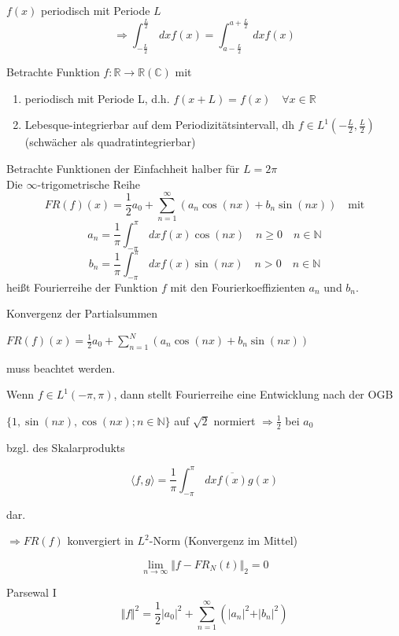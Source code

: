 \documentclass{physikprotokoll}
\begin{document}
	\begin{Bem}
		$f(x)$ periodisch mit Periode $L$
		$$\Rightarrow \int_{-\frac{L}{2}}^{\frac{L}{2}} \,dx f(x) = \int_{a-\frac{L}{2}}^{a+\frac{L}{2}} \,dx f(x)$$
	\end{Bem}

	Betrachte Funktion $f: \mathbb{R}\rightarrow\mathbb{R}(\mathbb{C})$ mit
	\begin{enumerate}[label=(\roman*)]
		\item periodisch mit Periode L, d.h. $f(x+L) = f(x) \quad \forall x \in \mathbb{R}$
		\item Lebesque-integrierbar auf dem Periodizitätsintervall, dh $f \in L^1(-\frac{L}{2},\frac{L}{2})$ (schwächer als quadratintegrierbar)
	\end{enumerate}

	Betrachte Funktionen der Einfachheit halber für $L=2\pi$\\
	Die $\infty$-trigometrische Reihe
	$$FR(f)(x)= \frac{1}{2} a_0 + \sum_{n=1}^\infty (a_n \cos(n x) + b_n \sin(n x)) \quad \textrm{mit}$$
	$$a_n = \frac{1}{\pi} \int_{-\pi}^{\pi} \,dx f(x)\cos(nx) \quad n \geq 0 \quad n \in \mathbb{N}$$
	$$b_n = \frac{1}{\pi} \int_{-\pi}^{\pi} \,dx f(x)\sin(nx) \quad n>0 \quad n \in \mathbb{N}$$
	heißt Fourierreihe der Funktion $f$ mit den Fourierkoeffizienten $a_n$ und $b_n$.

	Konvergenz der Partialsummen

	$FR(f)(x)= \frac{1}{2} a_0 + \sum_{n=1}^N (a_n \cos(n x) + b_n \sin(n x))$

	muss beachtet werden.

	\begin{Bem}
		Wenn $f \in L^1(-\pi,\pi)$, dann stellt Fourierreihe eine Entwicklung nach der
		OGB

		$\{1, \sin(nx), \cos(nx); n \in \mathbb{N}\}$ auf $\sqrt{2}$ normiert $\Rightarrow \frac{1}{2}$ bei $a_0$

		bzgl. des Skalarprodukts

		$$\langle f,g \rangle =  \frac{1}{\pi} \int_{-\pi}^{\pi} \,dx \overline{f(x)} g(x)$$

		dar.

		$\Rightarrow FR(f)$ konvergiert in $L^2$-Norm (Konvergenz im Mittel)

		$$\lim_{n\rightarrow \infty} {\Vert f- FR_N(t) \Vert}_2 = 0$$
	\end{Bem}

	\begin{Satz}{Parsewal I}
		$$\Vert f \Vert^2 = \frac{1}{2} \vert a_0 \vert^2 + \sum_{n=1}^{\infty} \left(\vert a_n \vert^2 + \vert b_n \vert^2\right)$$
	\end{Satz}
\end{document}
